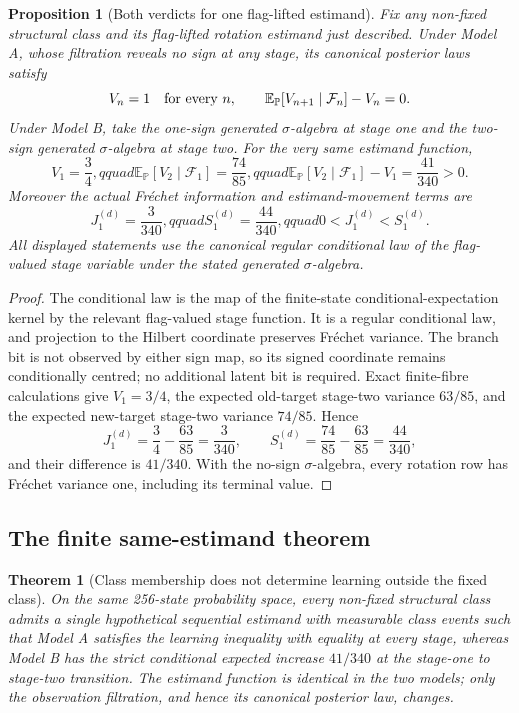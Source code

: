 \documentclass{article}
\newcommand{\E}{\mathbb{E}_{\mathbb{P}}}
\newcommand{\F}{\mathcal{F}}
\newcommand{\1}{\mathbbm{1}}
\newtheorem{prop}{Proposition}
\newtheorem{theorem}{Theorem}
\begin{document}
\begin{prop}[Both verdicts for one flag-lifted estimand]
\label{bothverdicts}
Fix any non-fixed structural class and its flag-lifted rotation estimand just described.  Under
Model A, whose filtration reveals no sign at any stage, its canonical posterior laws satisfy
\[
V_n=1\quad\hbox{for every }n,
\qquad
\E[V_{n+1}\mid\F_n]-V_n=0.
\]
Under Model B, take the one-sign generated $\sigma$-algebra at stage one and the two-sign generated
$\sigma$-algebra at stage two.  For the very same estimand function,
\[
V_1=\frac34,qquad
\E[V_2\mid\F_1]=\frac{74}{85},qquad
\E[V_2\mid\F_1]-V_1=\frac{41}{340}>0.
\]
Moreover the actual Fr\'echet information and estimand-movement terms are
\[
J^{(d)}_1=\frac{3}{340},qquad
S^{(d)}_1=\frac{44}{340},qquad
0<J^{(d)}_1<S^{(d)}_1.
\]
All displayed statements use the canonical regular conditional law of the flag-valued stage
variable under the stated generated $\sigma$-algebra.
\end{prop}

\begin{proof}
The conditional law is the map of the finite-state conditional-expectation kernel by the relevant
flag-valued stage function.  It is a regular conditional law, and projection to the Hilbert
coordinate preserves Fr\'echet variance.  The branch bit is not observed by either sign map, so its
signed coordinate remains conditionally centred; no additional latent bit is required.  Exact
finite-fibre calculations give $V_1=3/4$, the expected old-target stage-two variance $63/85$, and
the expected new-target stage-two variance $74/85$.  Hence
\[
J^{(d)}_1=\frac34-\frac{63}{85}=\frac{3}{340},\qquad
S^{(d)}_1=\frac{74}{85}-\frac{63}{85}=\frac{44}{340},
\]
and their difference is $41/340$.  With the no-sign $\sigma$-algebra, every rotation row has
Fr\'echet variance one, including its terminal value.
\end{proof}

\subsection*{The finite same-estimand theorem}

\begin{theorem}[Class membership does not determine learning outside the fixed class]
\label{impossibility}
On the same 256-state probability space, every non-fixed structural class admits a single
hypothetical sequential estimand with measurable class events such that Model A satisfies the
learning inequality with equality at every stage, whereas Model B has the strict conditional
expected increase $41/340$ at the stage-one to stage-two transition.  The estimand function is
identical in the two models; only the observation filtration, and hence its canonical posterior
law, changes.
\end{theorem}
\end{document}

